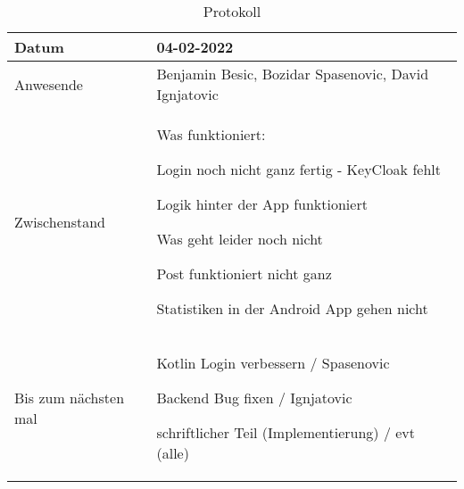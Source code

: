\begin{table}
    \begin{tabular}{ |p{3cm}|p{10cm}|  }
        \hline
        Datum & 04-02-2022\\
        \hline
        Anwesende & Benjamin Besic, Bozidar Spasenovic, David Ignjatovic\\

        \hline
        Zwischenstand& 

        Was funktioniert:

    Login noch nicht ganz fertig - KeyCloak fehlt

    Logik hinter der App funktioniert

    Was geht leider noch nicht

    Post funktioniert nicht ganz

    Statistiken in der Android App gehen nicht




    
    \\
        \hline
        Bis zum nächsten mal & 





        Kotlin Login verbessern / Spasenovic

        Backend Bug fixen / Ignjatovic
    
        schriftlicher Teil (Implementierung) / evt (alle)
    
    


    
    
    
    \\
        \hline
    \end{tabular}
    \caption{Protokoll}
    \label{tab:my_label}
\end{table}
